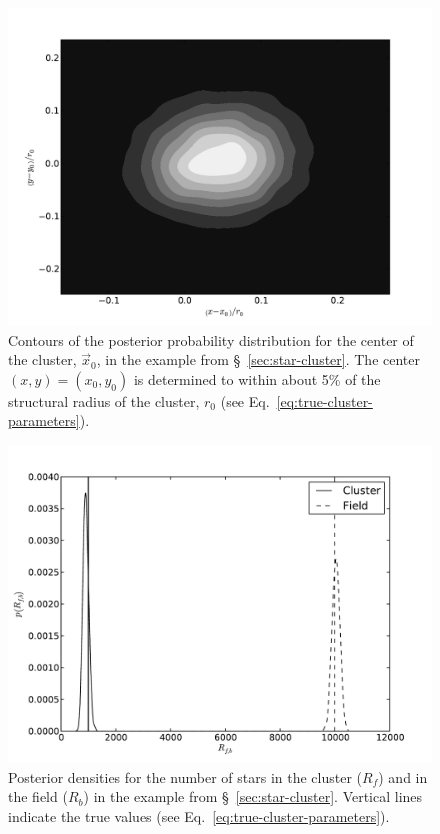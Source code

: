 \documentclass[aps,prd]{revtex4-1}
\begin{document}
\begin{figure}
  \includegraphics[width=\columnwidth]{sky_location}
  \caption{\label{fig:sky-loc} Contours of the posterior probability
    distribution for the center of the cluster, $\vec{x}_0$, in the
    example from \S~\ref{sec:star-cluster}.  The center $(x,y) =
    \left(x_0, y_0\right)$ is determined to within about 5\%
    of the structural radius of the cluster, $r_0$ (see
    Eq.~\eqref{eq:true-cluster-parameters}).}
\end{figure}

\begin{figure}
  \includegraphics[width=\columnwidth]{numbers}
  \caption{\label{fig:cluster-number} Posterior densities for the
    number of stars in the cluster ($R_f$) and in the field ($R_b$) in
    the example from \S~\ref{sec:star-cluster}.  Vertical lines
    indicate the true values (see
    Eq.~\eqref{eq:true-cluster-parameters}). }
\end{figure}
\end{document}
